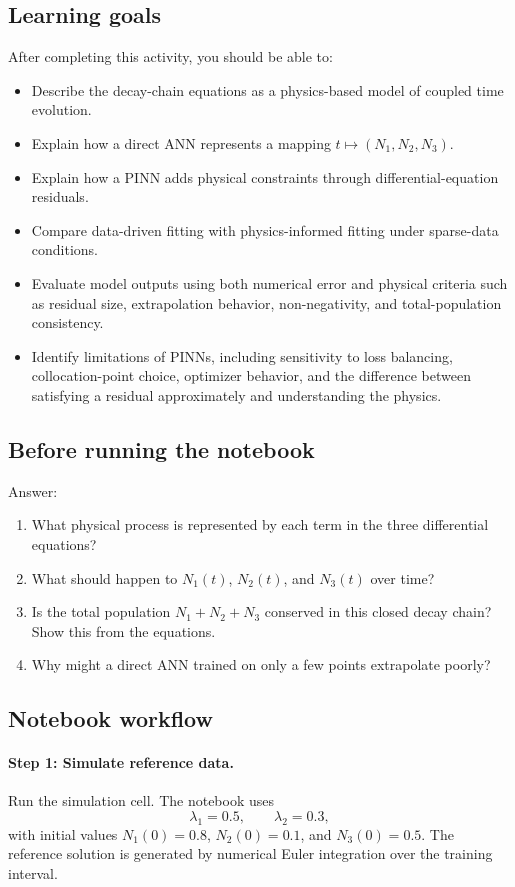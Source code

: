 \documentclass[11pt]{article}
\begin{document}
\subsection*{Learning goals}
After completing this activity, you should be able to:
\begin{itemize}
    \item Describe the decay-chain equations as a physics-based model of coupled time evolution.
    \item Explain how a direct ANN represents a mapping \(t\mapsto (N_1,N_2,N_3)\).
    \item Explain how a PINN adds physical constraints through differential-equation residuals.
    \item Compare data-driven fitting with physics-informed fitting under sparse-data conditions.
    \item Evaluate model outputs using both numerical error and physical criteria such as residual size, extrapolation behavior, non-negativity, and total-population consistency.
    \item Identify limitations of PINNs, including sensitivity to loss balancing, collocation-point choice, optimizer behavior, and the difference between satisfying a residual approximately and understanding the physics.
\end{itemize}

\subsection*{Before running the notebook}
Answer:
\begin{enumerate}
    \item What physical process is represented by each term in the three differential equations?
    \item What should happen to \(N_1(t)\), \(N_2(t)\), and \(N_3(t)\) over time?
    \item Is the total population \(N_1+N_2+N_3\) conserved in this closed decay chain? Show this from the equations.
    \item Why might a direct ANN trained on only a few points extrapolate poorly?
\end{enumerate}

\subsection*{Notebook workflow}

\paragraph{Step 1: Simulate reference data.}
Run the simulation cell. The notebook uses
\[
\lambda_1=0.5,\qquad \lambda_2=0.3,
\]
with initial values \(N_1(0)=0.8\), \(N_2(0)=0.1\), and \(N_3(0)=0.5\). The reference solution is generated by numerical Euler integration over the training interval.
\end{document}
